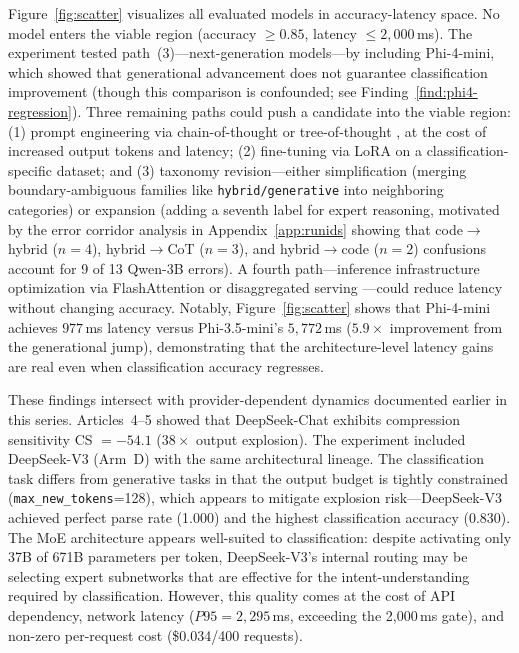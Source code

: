 \documentclass{article}
\begin{document}
Figure~\ref{fig:scatter} visualizes all evaluated models in accuracy-latency space. No model enters the viable region (accuracy $\geq 0.85$, latency $\leq 2{,}000$\,ms). The experiment tested path~(3)---next-generation models---by including Phi-4-mini, which showed that generational advancement does not guarantee classification improvement (though this comparison is confounded; see Finding~\ref{find:phi4-regression}). Three remaining paths could push a candidate into the viable region: (1) prompt engineering via chain-of-thought \citep{wei2022chain,wang2023selfconsistency} or tree-of-thought \citep{yao2024treeofthoughts}, at the cost of increased output tokens and latency; (2) fine-tuning via LoRA \citep{hu2022lora} on a classification-specific dataset; and (3) taxonomy revision---either simplification (merging boundary-ambiguous families like \texttt{hybrid/generative} into neighboring categories) or expansion (adding a seventh label for expert reasoning, motivated by the error corridor analysis in Appendix~\ref{app:runids} showing that code$\to$hybrid ($n = 4$), hybrid$\to$CoT ($n = 3$), and hybrid$\to$code ($n = 2$) confusions account for 9 of 13 Qwen-3B errors). A fourth path---inference infrastructure optimization via FlashAttention \citep{dao2022flashattention,dao2023flashattention2} or disaggregated serving \citep{zhong2024distserve}---could reduce latency without changing accuracy. Notably, Figure~\ref{fig:scatter} shows that Phi-4-mini achieves $977$\,ms latency versus Phi-3.5-mini's $5{,}772$\,ms ($5.9\times$ improvement from the generational jump), demonstrating that the architecture-level latency gains are real even when classification accuracy regresses.

These findings intersect with provider-dependent dynamics documented earlier in this series. Articles~4--5 \citep{johnson2026greenai,johnson2026benchmark} showed that DeepSeek-Chat exhibits compression sensitivity CS $= -54.1$ ($38\times$ output explosion). The experiment included DeepSeek-V3 (Arm~D) with the same architectural lineage. The classification task differs from generative tasks in that the output budget is tightly constrained (\texttt{max\_new\_tokens}=128), which appears to mitigate explosion risk---DeepSeek-V3 achieved perfect parse rate (1.000) and the highest classification accuracy (0.830). The MoE architecture \citep{shazeer2017moe,fedus2022switch,dai2024deepseek} appears well-suited to classification: despite activating only 37B of 671B parameters per token, DeepSeek-V3's internal routing may be selecting expert subnetworks that are effective for the intent-understanding required by classification. However, this quality comes at the cost of API dependency, network latency ($P95 = 2{,}295$\,ms, exceeding the 2,000\,ms gate), and non-zero per-request cost (\$0.034/400 requests).
\end{document}
